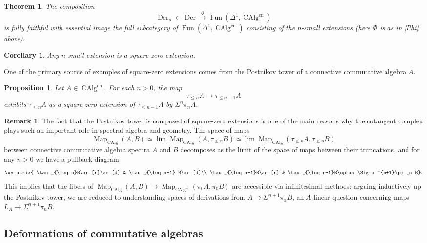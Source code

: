 \documentclass{article}
\newtheorem{theorem}{Theorem}[subsection]
\newtheorem{corollary}{Corollary}[subsection]
\newtheorem{proposition}{Proposition}[subsection]
\theoremstyle{definition}
\newtheorem{remark}{Remark}[subsection]
\newcommand{\too}{\longrightarrow}
\DeclareMathOperator{\CAlg}{CAlg}
\DeclareMathOperator{\Der}{Der}
\DeclareMathOperator{\Fun}{Fun}
\DeclareMathOperator{\Map}{Map}
\newcommand{\cn}{\mathrm{cn}}
\begin{document}
\begin{theorem}{\em \cite[Theorem 7.4.1.26]{HA}}
The composition
\[
\Der_n\subset\Der\overset{\Phi}{\too}\Fun(\Delta^1,\CAlg^{\cn})
\]
is fully faithful with essential image the full subcategory of $\Fun(\Delta^1,\CAlg^{\cn})$ consisting of the $n$-small extensions (here $\Phi$ is as in \autoref{Phi} above).
\end{theorem}

\begin{corollary}
Any $n$-small extension is a square-zero extension.
\end{corollary}
One of the primary source of examples of square-zero extensions comes from the Postnikov tower of a connective commutative algebra $A$.
\begin{proposition}{\em \cite[Corollary 7.4.1.28]{HA}}
Let $A\in\CAlg^{\cn}$.
For each $n>0$, the map
\[
\tau_{\leq n}A\too\tau_{\leq n-1}A
\]
exhibits $\tau_{\leq n}A$ as a square-zero extension of $\tau_{\leq n-1} A$ by $\Sigma^n\pi_{n} A$.
\end{proposition}

\begin{remark}
The fact that the Postnikov tower is composed of square-zero extensions is one of the main reasons why the cotangent complex plays such an important role in spectral algebra and geometry.
The space of maps
\[
\Map_{\CAlg}(A,B)\simeq\lim\Map_{\CAlg}(A,\tau_{\leq n} B)\simeq\lim\Map_{\CAlg}(\tau_{\leq n}A,\tau_{\leq n}B)
\]
between connective commutative algebra spectra $A$ and $B$ decomposes as the limit of the space of maps between their truncations, and for any $n>0$ we have a pullback diagram
\[
\xymatrix{
\tau_{\leq n}B\ar[r]\ar[d] & \tau_{\leq n-1} B\ar[d]\\
\tau_{\leq n-1}B\ar[r] & \tau_{\leq n-1}B\oplus\Sigma^{n+1}\pi_n B}.
\]
This implies that the fibers of
$
\Map_{\CAlg}(A,B)\too\Map_{\CAlg^\heartsuit}(\pi_0 A,\pi_0 B)
$
are accessible via infinitesimal methods: arguing inductively up the Postnikov tower, we are reduced to understanding spaces of derivations from $A\to\Sigma^{n+1}\pi_nB$, an $A$-linear question concerning maps $L_A\to\Sigma^{n+1}\pi_n B$.
\end{remark}

\subsection{Deformations of commutative algebras}
\end{document}
